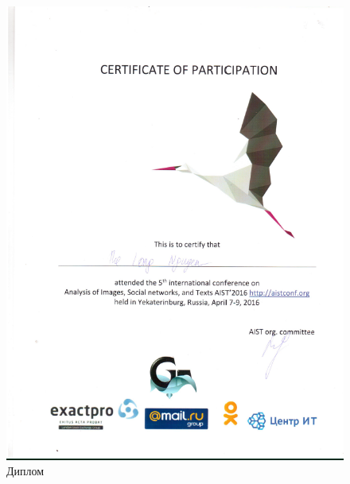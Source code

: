 \begin{figure}[ht!]
\centering
\includegraphics [scale=0.7] {images/p29.png}
\begin{center}
\caption{Диплом}\label{imgp29}
\end{center}
\end{figure}

